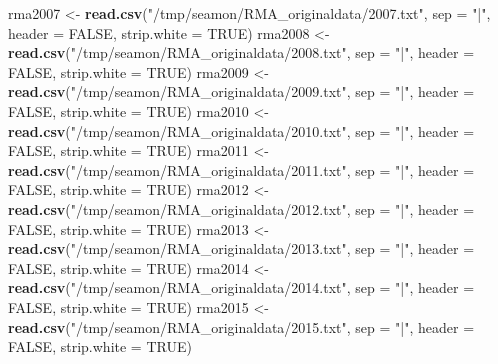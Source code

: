 \documentclass[]{article}
\newenvironment{Shaded}{\begin{snugshade}}{\end{snugshade}}
\newcommand{\DataTypeTok}[1]{\textcolor[rgb]{0.13,0.29,0.53}{#1}}
\newcommand{\KeywordTok}[1]{\textcolor[rgb]{0.13,0.29,0.53}{\textbf{#1}}}
\newcommand{\NormalTok}[1]{#1}
\newcommand{\OtherTok}[1]{\textcolor[rgb]{0.56,0.35,0.01}{#1}}
\newcommand{\StringTok}[1]{\textcolor[rgb]{0.31,0.60,0.02}{#1}}
\begin{document}
\begin{Shaded}
\begin{Highlighting}[]
\NormalTok{rma2007 <-}\StringTok{ }\KeywordTok{read.csv}\NormalTok{(}\StringTok{"/tmp/seamon/RMA_originaldata/2007.txt"}\NormalTok{, }\DataTypeTok{sep =} \StringTok{"|"}\NormalTok{, }\DataTypeTok{header =} \OtherTok{FALSE}\NormalTok{, }\DataTypeTok{strip.white =} \OtherTok{TRUE}\NormalTok{)}
\NormalTok{rma2008 <-}\StringTok{ }\KeywordTok{read.csv}\NormalTok{(}\StringTok{"/tmp/seamon/RMA_originaldata/2008.txt"}\NormalTok{, }\DataTypeTok{sep =} \StringTok{"|"}\NormalTok{, }\DataTypeTok{header =} \OtherTok{FALSE}\NormalTok{, }\DataTypeTok{strip.white =} \OtherTok{TRUE}\NormalTok{)}
\NormalTok{rma2009 <-}\StringTok{ }\KeywordTok{read.csv}\NormalTok{(}\StringTok{"/tmp/seamon/RMA_originaldata/2009.txt"}\NormalTok{, }\DataTypeTok{sep =} \StringTok{"|"}\NormalTok{, }\DataTypeTok{header =} \OtherTok{FALSE}\NormalTok{, }\DataTypeTok{strip.white =} \OtherTok{TRUE}\NormalTok{)}
\NormalTok{rma2010 <-}\StringTok{ }\KeywordTok{read.csv}\NormalTok{(}\StringTok{"/tmp/seamon/RMA_originaldata/2010.txt"}\NormalTok{, }\DataTypeTok{sep =} \StringTok{"|"}\NormalTok{, }\DataTypeTok{header =} \OtherTok{FALSE}\NormalTok{, }\DataTypeTok{strip.white =} \OtherTok{TRUE}\NormalTok{)}
\NormalTok{rma2011 <-}\StringTok{ }\KeywordTok{read.csv}\NormalTok{(}\StringTok{"/tmp/seamon/RMA_originaldata/2011.txt"}\NormalTok{, }\DataTypeTok{sep =} \StringTok{"|"}\NormalTok{, }\DataTypeTok{header =} \OtherTok{FALSE}\NormalTok{, }\DataTypeTok{strip.white =} \OtherTok{TRUE}\NormalTok{)}
\NormalTok{rma2012 <-}\StringTok{ }\KeywordTok{read.csv}\NormalTok{(}\StringTok{"/tmp/seamon/RMA_originaldata/2012.txt"}\NormalTok{, }\DataTypeTok{sep =} \StringTok{"|"}\NormalTok{, }\DataTypeTok{header =} \OtherTok{FALSE}\NormalTok{, }\DataTypeTok{strip.white =} \OtherTok{TRUE}\NormalTok{)}
\NormalTok{rma2013 <-}\StringTok{ }\KeywordTok{read.csv}\NormalTok{(}\StringTok{"/tmp/seamon/RMA_originaldata/2013.txt"}\NormalTok{, }\DataTypeTok{sep =} \StringTok{"|"}\NormalTok{, }\DataTypeTok{header =} \OtherTok{FALSE}\NormalTok{, }\DataTypeTok{strip.white =} \OtherTok{TRUE}\NormalTok{)}
\NormalTok{rma2014 <-}\StringTok{ }\KeywordTok{read.csv}\NormalTok{(}\StringTok{"/tmp/seamon/RMA_originaldata/2014.txt"}\NormalTok{, }\DataTypeTok{sep =} \StringTok{"|"}\NormalTok{, }\DataTypeTok{header =} \OtherTok{FALSE}\NormalTok{, }\DataTypeTok{strip.white =} \OtherTok{TRUE}\NormalTok{)}
\NormalTok{rma2015 <-}\StringTok{ }\KeywordTok{read.csv}\NormalTok{(}\StringTok{"/tmp/seamon/RMA_originaldata/2015.txt"}\NormalTok{, }\DataTypeTok{sep =} \StringTok{"|"}\NormalTok{, }\DataTypeTok{header =} \OtherTok{FALSE}\NormalTok{, }\DataTypeTok{strip.white =} \OtherTok{TRUE}\NormalTok{)}



\end{Highlighting}
\end{Shaded}
\end{document}
